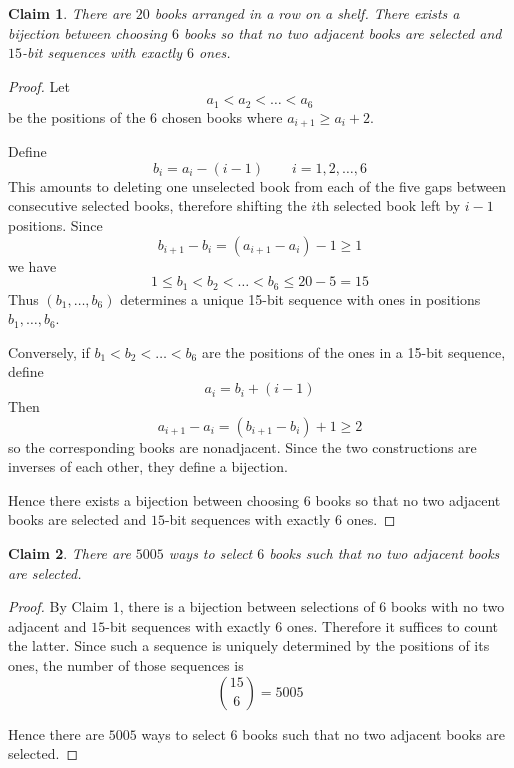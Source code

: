 \documentclass{article}
\newtheorem{claim}{Claim}
\begin{document}
\begin{claim}
    There are $20$ books arranged in a row on a shelf. There exists a bijection between choosing
    $6$ books so that no two adjacent books are selected and $15$-bit sequences with exactly $6$ 
    ones.
\end{claim}

\begin{proof}
    Let
    \[
    a_1 < a_2 < \dots < a_6
    \]
    be the positions of the $6$ chosen books where $a_{i+1} \ge a_i + 2$.

    \medskip

    Define
    \[
    b_i = a_i - (i - 1) \qquad i = 1, 2, \dots, 6
    \]
    This amounts to deleting one unselected book from each of the five gaps between consecutive 
    selected books, therefore shifting the $i$th selected book left by $i - 1$ positions. Since
    \[
    b_{i+1} - b_i = (a_{i+1} - a_i) - 1 \ge 1
    \]
    we have
    \[
    1 \le b_1 < b_2 < \dots < b_6 \le 20 - 5 = 15
    \]
    Thus $(b_1, \dots, b_6)$ determines a unique 15-bit sequence with ones in positions $b_1, \dots, 
    b_6$.

    \medskip

    Conversely, if $b_1 < b_2 < \dots < b_6$ are the positions of the ones in a 15-bit sequence, 
    define
    \[
    a_i = b_i + (i - 1)
    \]
    Then
    \[
    a_{i+1} - a_i = (b_{i+1} - b_i) + 1 \ge 2
    \]
    so the corresponding books are nonadjacent. Since the two constructions are inverses of each 
    other, they define a bijection.

    \medskip

    Hence there exists a bijection between choosing $6$ books so that no two adjacent books are 
    selected and $15$-bit sequences with exactly $6$ ones.
\end{proof}

\begin{claim}
    There are $5005$ ways to select $6$ books such that no two adjacent books 
    are selected. 
\end{claim}

\begin{proof}
    By Claim 1, there is a bijection between selections of $6$ books with no two adjacent and 
    $15$-bit sequences with exactly $6$ ones. Therefore it suffices to count the latter. Since 
    such a sequence is uniquely determined by the positions of its ones, the number of those 
    sequences is
    \[
    \binom{15}{6} = 5005
    \]

    \medskip

    Hence there are $5005$ ways to select $6$ books such that no two adjacent books are selected.
\end{proof}
\end{document}
